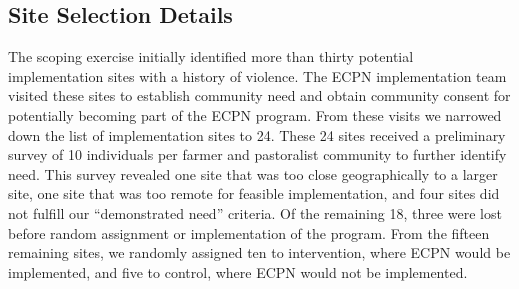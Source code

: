 \documentclass[
]{article}
\begin{document}
\hypertarget{site-selection-details}{%
\subsection{Site Selection Details}\label{site-selection-details}}

The scoping exercise initially identified more than thirty potential
implementation sites with a history of violence. The ECPN implementation
team visited these sites to establish community need and obtain
community consent for potentially becoming part of the ECPN program.
From these visits we narrowed down the list of implementation sites to
24. These 24 sites received a preliminary survey of 10 individuals per
farmer and pastoralist community to further identify need. This survey
revealed one site that was too close geographically to a larger site,
one site that was too remote for feasible implementation, and four sites
did not fulfill our ``demonstrated need'' criteria. Of the remaining 18,
three were lost before random assignment or implementation of the
program. From the fifteen remaining sites, we randomly assigned ten to
intervention, where ECPN would be implemented, and five to control,
where ECPN would not be implemented.
\end{document}
